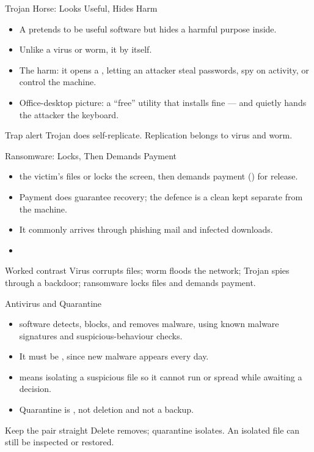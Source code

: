 \documentclass[aspectratio=169]{beamer}
\begin{document}
\begin{frame}{Trojan Horse: Looks Useful, Hides Harm}
  \begin{itemize}
    \item A  pretends to be useful software but hides a
      harmful purpose inside.
    \item Unlike a virus or worm, it  by itself.
    \item The harm: it opens a , letting an attacker steal
      passwords, spy on activity, or control the machine.
    \item Office-desktop picture: a ``free'' utility that installs fine ---
      and quietly hands the attacker the keyboard.
  \end{itemize}
  \begin{alertblock}{Trap alert}
    Trojan does  self-replicate. Replication belongs to virus
    and worm.
  \end{alertblock}
\end{frame}

\begin{frame}{Ransomware: Locks, Then Demands Payment}
  \begin{itemize}
    \item {}  the victim's files or locks the
      screen, then demands payment () for release.
    \item Payment does  guarantee recovery; the defence is a clean
       kept separate from the machine.
    \item It commonly arrives through phishing mail and infected downloads.
    \item {}
  \end{itemize}
  \begin{exampleblock}{Worked contrast}
    Virus corrupts files; worm floods the network; Trojan spies through a
    backdoor; ransomware locks files and demands payment.
  \end{exampleblock}
\end{frame}

\begin{frame}{Antivirus and Quarantine}
  \begin{itemize}
    \item {} software detects, blocks, and removes malware,
      using known malware signatures and suspicious-behaviour checks.
    \item It must be , since new malware appears
      every day.
    \item {} means isolating a suspicious file so it cannot
      run or spread while awaiting a decision.
    \item Quarantine is , not deletion and not a backup.
  \end{itemize}
  \begin{block}{Keep the pair straight}
    Delete removes; quarantine isolates. An isolated file can still be
    inspected or restored.
  \end{block}
\end{frame}
\end{document}
